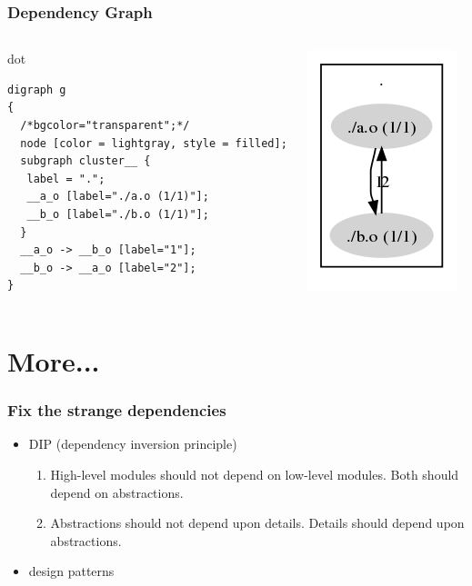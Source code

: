 \begin{frame}[fragile]
	\frametitle{Dependency Graph}
	\begin{columns}
		\begin{block}{dot}
			\begin{verbatim}
digraph g
{
  /*bgcolor="transparent";*/
  node [color = lightgray, style = filled];
  subgraph cluster__ {
   label = ".";
   __a_o [label="./a.o (1/1)"];
   __b_o [label="./b.o (1/1)"];
  }
  __a_o -> __b_o [label="1"];
  __b_o -> __a_o [label="2"];
}
			\end{verbatim}
		\end{block}

		\begin{center}
			\includegraphics[scale=.5]{dep.png}
		\end{center}
	\end{columns}
\end{frame}


\section{More...}
\begin{frame}[t]
	\frametitle{Fix the strange dependencies}
	\begin{itemize}
		\item<+-|alert@+> DIP (dependency inversion principle)
		\begin{enumerate}
			\item<+-|alert@+> High-level modules should not depend on low-level modules. Both should depend on abstractions.
			\item<+-|alert@+> Abstractions should not depend upon details. Details should depend upon abstractions.
		\end{enumerate}
		\item<+-|alert@+> design patterns
	\end{itemize}
\end{frame}

